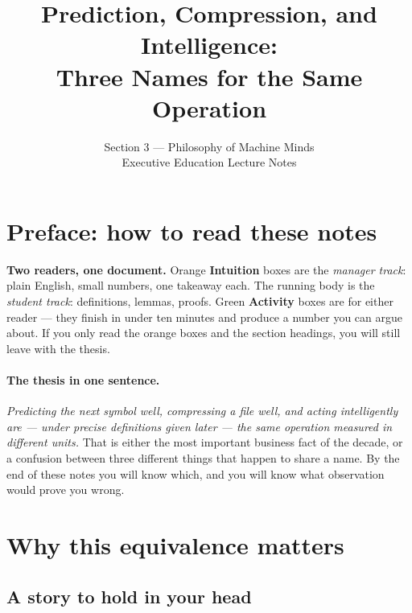 \documentclass[12pt,a4paper]{article}
\title{Prediction, Compression, and Intelligence:\\
       Three Names for the Same Operation}
\author{Section 3 --- Philosophy of Machine Minds\\
        Executive Education Lecture Notes}
\date{}
\theoremstyle{plain}
\theoremstyle{definition}
\begin{document}
\maketitle
\tableofcontents
\newpage


\section*{Preface: how to read these notes}

\begin{howtoread}
\textbf{Two readers, one document.}
Orange \textbf{Intuition} boxes are the \emph{manager track}: plain
English, small numbers, one takeaway each. The running body is the
\emph{student track}: definitions, lemmas, proofs. Green
\textbf{Activity} boxes are for either reader --- they finish in under
ten minutes and produce a number you can argue about.
If you only read the orange boxes and the section headings, you will
still leave with the thesis.
\end{howtoread}

\paragraph{The thesis in one sentence.}
\emph{Predicting the next symbol well, compressing a file well, and
acting intelligently are --- under precise definitions given later ---
the same operation measured in different units.}
That is either the most important business fact of the decade, or a
confusion between three different things that happen to share a name.
By the end of these notes you will know which, and you will know what
observation would prove you wrong.


\section{Why this equivalence matters}
\label{sec:why}

\subsection*{A story to hold in your head}
\end{document}
